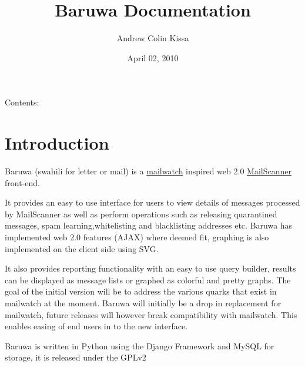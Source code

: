 \documentclass[a4paper,10pt,english]{manual}
\title{Baruwa Documentation}
\date{April 02, 2010}
\author{Andrew Colin Kissa}
\begin{document}
\maketitle
\tableofcontents
\hypertarget{--doc-index}{}


Contents:

\resetcurrentobjects
\hypertarget{--doc-introduction}{}

\chapter{Introduction}

Baruwa (swahili for letter or mail) is a \href{http://mailwatch.sf.net/}{mailwatch} inspired
web 2.0 \href{http://www.mailscanner.info/}{MailScanner} front-end.

It provides an easy to use interface for users to view details of messages processed by
MailScanner as well as perform operations such as releasing quarantined messages,
spam learning,whitelisting and blacklisting addresses etc. Baruwa has implemented web 2.0
features (AJAX) where deemed fit, graphing is also implemented on the client side using SVG.

It also provides reporting functionality with an easy to use query builder, results can be
displayed as message lists or graphed as colorful and pretty graphs. The goal of the initial
version will be to address the various quarks that exist in mailwatch at the moment. Baruwa
will initially be a drop in replacement for mailwatch, future releases will however break
compatibility with mailwatch. This enables easing of end users in to the new interface.

Baruwa is written in Python using the Django Framework and MySQL for storage, it is released
under the GPLv2
\end{document}
